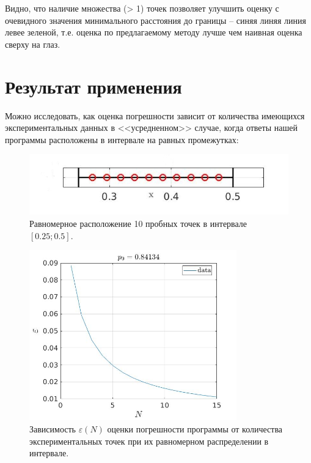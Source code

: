 \documentclass[a4paper,12pt]{article} %
\begin{document}
Видно, что наличие множества (> 1) точек позволяет улучшить оценку с очевидного значения минимального расстояния до границы -- синяя линяя линия левее зеленой, т.е. оценка по предлагаемому методу лучше чем наивная оценка сверху на глаз.

\newpage

\section{Результат применения}

Можно исследовать, как оценка погрешности зависит от количества имеющихся экспериментальных данных в <<усредненном>> случае, когда ответы нашей программы расположены в интервале на равных промежутках:

\begin{figure}[h!]
\begin{center}
\includegraphics[width=1\textwidth]{./pics/uni_line}
\end{center}
\caption{Равномерное расположение 10 пробных точек в интервале $[0.25; 0.5]$.} \label{img:uni_line}
\end{figure}

\begin{figure}[h!]
\begin{center}
\includegraphics[width=0.8\textwidth]{./pics/linear}
\end{center}
\caption{Зависимость $\varepsilon(N)$ оценки погрешности программы  от количества экспериментальных точек при их равномерном распределении в интервале.} \label{img:linear}
\end{figure}
\end{document}
